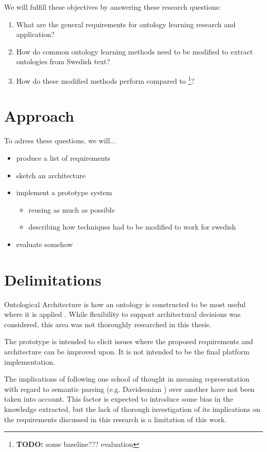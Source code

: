 \documentclass[a4paper]{report}
\newcommand{\todo}[1]{\footnote{{\color{red} {\bf TODO:} #1}}}
\begin{document}
We will fulfill these objectives by answering these research questions:

\begin{enumerate}
  \item{What are the general requirements for ontology learning research and application?}
  \item{How do common ontology learning methods need to be modified to extract ontologies from Swedish text?}
  \item{How do these modified methods perform compared to \todo{some baseline??? evaluation}?}
\end{enumerate}

\section{Approach}

To adress these questions, we will...

\begin{itemize}
  \item produce a list of requirements
  \item sketch an architecture
  \item implement a prototype system
    \begin{itemize}
      \item reusing as much as possible
      \item describing how techniques had to be modified to work for swedish
    \end{itemize}
  \item evaluate somehow
\end{itemize}

\section{Delimitations}

Ontological Architecture is how an ontology is constructed to be most useful where it is applied \cite{OntArchChapter}. While flexibility to support architectural decisions was considered, this area was not thoroughly researched in this thesis.

The prototype is intended to elicit issues where the proposed requirements and architecture can be improved upon.
It is not intended to be the final platform implementation.

The implications of following one school of thought in meaning representation with regard to semantic parsing (e.g. Davidsonian \cite{DavidsonianSemantics}) over another have not been taken into account.
This factor is expected to introduce some bias in the knowledge extracted, but the lack of thorough investigation of its implications on the requirements discussed in this research is a limitation of this work.
\end{document}
